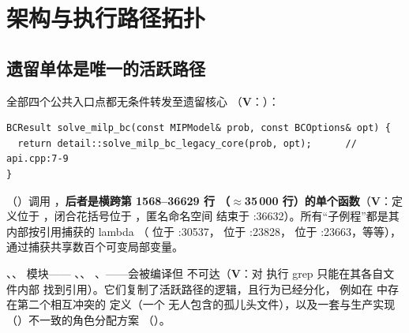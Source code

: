 \documentclass[11pt]{ctexart}
\begin{document}
\section{架构与执行路径拓扑}

\subsection{遗留单体是唯一的活跃路径}
\label{sec:topology}
全部四个公共入口点都无条件转发至遗留核心
（\textbf{V}：）：
\begin{lstlisting}[style=code]
BCResult solve_milp_bc(const MIPModel& prob, const BCOptions& opt) {
  return detail::solve_milp_bc_legacy_core(prob, opt);      // api.cpp:7-9
}
\end{lstlisting}
（）调用
，\textbf{后者是横跨第 1568--36629 行
（$\approx$35\,000 行）的单个函数}（\textbf{V}：定义位于
，闭合花括号位于 ，匿名命名空间
结束于 :36632）。所有“子例程”都是其内部按引用捕获的 lambda
（ 位于 :30537，
位于 :23828， 位于 :23663，等等），
通过捕获共享数百个可变局部变量。

、、 模块——
、、
、——会被编译但
不可达（\textbf{V}：对  执行 grep 只能在其各自文件内部
找到引用）。它们复制了活跃路径的逻辑，且行为已经分化，
例如在
中存在第二个相互冲突的  定义（一个
无人包含的孤儿头文件），以及一套与生产实现
（）不一致的角色分配方案
（）。
\end{document}
